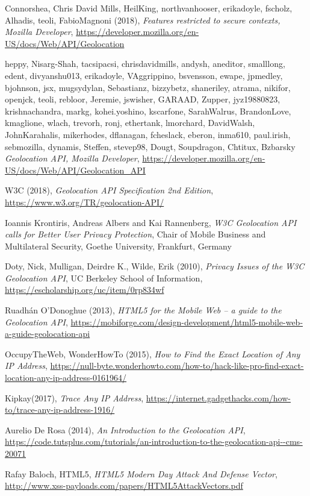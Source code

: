\documentclass[11pt ,a4paper , twoside , openright ]{article}
\begin{document}
\newpage
\begin{thebibliography}{99}
	\bibitem{}
	 Connorshea, Chris David Mills, HeilKing, northvanhooser, erikadoyle, fscholz, Alhadis, teoli, FabioMagnoni (2018),
	 \emph{Features restricted to secure contexts, Mozilla Developer},
	\url{https://developer.mozilla.org/en-US/docs/Web/API/Geolocation}
	
	\bibitem{}
	heppy, Nisarg-Shah, tacsipacsi, chrisdavidmills, andysh, aneditor, smalllong, edent, divyanshu013, erikadoyle, VAggrippino, bsvensson, ewape, jpmedley, bjohnson, jsx, mugsydylan, Sebastianz, bizzybetz, shaneriley, atrama, nikifor, openjck, teoli, rebloor, Jeremie, jswisher, GARAAD, Zupper, jyz19880823, krishnachandra, markg, kohei.yoshino, kscarfone, SarahWalrus, BrandonLove, kmaglione, wlach, trevorh, ronj, ethertank, lmorchard, DavidWalsh, JohnKarahalis, mikerhodes, dflanagan, fcheslack, eberon, inma610, paul.irish, sebmozilla, dynamis, Steffen, stevep98, Dougt, Soupdragon, Chtitux, Bzbarsky
	\emph{Geolocation API, Mozilla Developer},
	\url{https://developer.mozilla.org/en-US/docs/Web/API/Geolocation_API}
	
	\bibitem{}
	W3C (2018), 
	\emph{Geolocation API Specification 2nd Edition},
	\url{https://www.w3.org/TR/geolocation-API/}
	
	\bibitem{}
	Ioannis Krontiris, Andreas Albers and Kai Rannenberg,
	\emph{W3C Geolocation API calls for
		Better User Privacy Protection}, 
	Chair of Mobile Business and Multilateral Security, Goethe University, Frankfurt, Germany
	
	\bibitem{}
	Doty, Nick, Mulligan, Deirdre K., Wilde, Erik (2010),
	\emph{Privacy Issues of the W3C Geolocation API}, UC Berkeley School of Information, \url{https://escholarship.org/uc/item/0rp834wf}
	
	\bibitem{}
	Ruadhán O'Donoghue (2013),
	\emph{HTML5 for the Mobile Web – a guide to the Geolocation API}, \url{https://mobiforge.com/design-development/html5-mobile-web-a-guide-geolocation-api}

	\bibitem{}
	OccupyTheWeb, WonderHowTo (2015),
	\emph{How to Find the Exact Location of Any IP Address}, \url{https://null-byte.wonderhowto.com/how-to/hack-like-pro-find-exact-location-any-ip-address-0161964/}
	
	\bibitem{}
	Kipkay(2017), 
	\emph{Trace Any IP Address}, \url{https://internet.gadgethacks.com/how-to/trace-any-ip-address-1916/}
	
	\bibitem{}
	Aurelio De Rosa (2014),
	\emph{An Introduction to the Geolocation API},
	\url{https://code.tutsplus.com/tutorials/an-introduction-to-the-geolocation-api--cms-20071}
	
	\bibitem{}
	Rafay Baloch, HTML5,
	\emph{HTML5 Modern Day Attack And Defense Vector},
	\url{http://www.xss-payloads.com/papers/HTML5AttackVectors.pdf}
\end{thebibliography}
\newpage
\listoffigures
\end{document}
